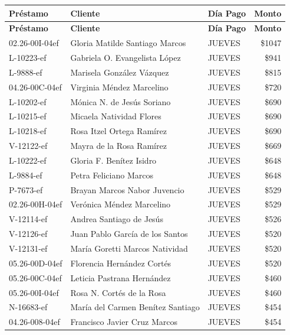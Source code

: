 \documentclass[11pt,a4paper]{article}
\newcommand{\money}[1]{\$\num{#1}}
\begin{document}
\begin{center}
\renewcommand{\arraystretch}{1.1}
\footnotesize
\begin{longtable}{lp{5.5cm}lr}
\toprule
\textbf{Pr\'estamo} & \textbf{Cliente} & \textbf{D\'ia Pago} & \textbf{Monto} \\
\midrule
\endfirsthead
\toprule
\textbf{Pr\'estamo} & \textbf{Cliente} & \textbf{D\'ia Pago} & \textbf{Monto} \\
\midrule
\endhead
02.26-00I-04ef & Gloria Matilde Santiago Marcos & JUEVES & \money{1047} \\
L-10223-ef & Gabriela O. Evangelista L\'opez & JUEVES & \money{941} \\
L-9888-ef & Marisela Gonz\'alez V\'azquez & JUEVES & \money{815} \\
04.26-00C-04ef & Virginia M\'endez Marcelino & JUEVES & \money{720} \\
L-10202-ef & M\'onica N. de Jes\'us Soriano & JUEVES & \money{690} \\
L-10215-ef & Micaela Natividad Flores & JUEVES & \money{690} \\
L-10218-ef & Rosa Itzel Ortega Ram\'irez & JUEVES & \money{690} \\
V-12122-ef & Mayra de la Rosa Ram\'irez & JUEVES & \money{669} \\
L-10222-ef & Gloria F. Ben\'itez Isidro & JUEVES & \money{648} \\
L-9884-ef & Petra Feliciano Marcos & JUEVES & \money{648} \\
P-7673-ef & Brayan Marcos Nabor Juvencio & JUEVES & \money{529} \\
02.26-00H-04ef & Ver\'onica M\'endez Marcelino & JUEVES & \money{529} \\
V-12114-ef & Andrea Santiago de Jes\'us & JUEVES & \money{526} \\
V-12126-ef & Juan Pablo Garc\'ia de los Santos & JUEVES & \money{520} \\
V-12131-ef & Mar\'ia Goretti Marcos Natividad & JUEVES & \money{520} \\
05.26-00D-04ef & Florencia Hern\'andez Cort\'es & JUEVES & \money{520} \\
05.26-00C-04ef & Leticia Pastrana Hern\'andez & JUEVES & \money{460} \\
05.26-00I-04ef & Rosa N. Cort\'es de la Rosa & JUEVES & \money{460} \\
N-16683-ef & Mar\'ia del Carmen Ben\'itez Santiago & JUEVES & \money{454} \\
04.26-008-04ef & Francisco Javier Cruz Marcos & JUEVES & \money{454} \\

\end{longtable}
\end{center}
\end{document}
